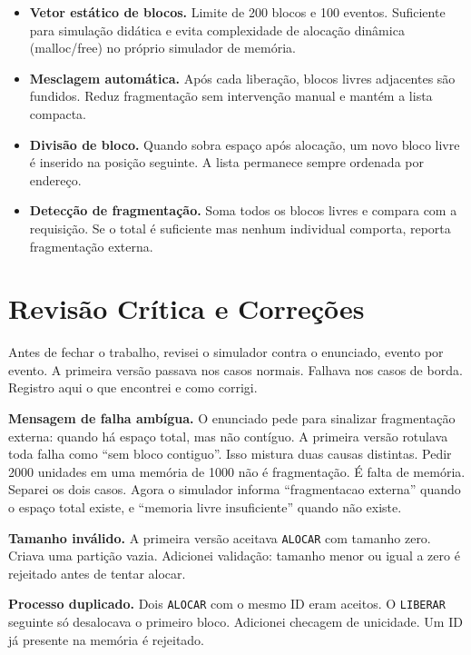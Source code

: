 \documentclass[12pt]{article}
\begin{document}
\begin{itemize}
    \item \textbf{Vetor estático de blocos.} Limite de 200 blocos e 100 eventos. Suficiente para simulação didática e evita complexidade de alocação dinâmica (malloc/free) no próprio simulador de memória.

    \item \textbf{Mesclagem automática.} Após cada liberação, blocos livres adjacentes são fundidos. Reduz fragmentação sem intervenção manual e mantém a lista compacta.

    \item \textbf{Divisão de bloco.} Quando sobra espaço após alocação, um novo bloco livre é inserido na posição seguinte. A lista permanece sempre ordenada por endereço.

    \item \textbf{Detecção de fragmentação.} Soma todos os blocos livres e compara com a requisição. Se o total é suficiente mas nenhum individual comporta, reporta fragmentação externa.
\end{itemize}

\section{Revisão Crítica e Correções}

Antes de fechar o trabalho, revisei o simulador contra o enunciado, evento por evento. A primeira versão passava nos casos normais. Falhava nos casos de borda. Registro aqui o que encontrei e como corrigi.

\textbf{Mensagem de falha ambígua.} O enunciado pede para sinalizar fragmentação externa: quando há espaço total, mas não contíguo. A primeira versão rotulava toda falha como ``sem bloco contiguo''. Isso mistura duas causas distintas. Pedir 2000 unidades em uma memória de 1000 não é fragmentação. É falta de memória. Separei os dois casos. Agora o simulador informa ``fragmentacao externa'' quando o espaço total existe, e ``memoria livre insuficiente'' quando não existe.

\textbf{Tamanho inválido.} A primeira versão aceitava \texttt{ALOCAR} com tamanho zero. Criava uma partição vazia. Adicionei validação: tamanho menor ou igual a zero é rejeitado antes de tentar alocar.

\textbf{Processo duplicado.} Dois \texttt{ALOCAR} com o mesmo ID eram aceitos. O \texttt{LIBERAR} seguinte só desalocava o primeiro bloco. Adicionei checagem de unicidade. Um ID já presente na memória é rejeitado.
\end{document}
